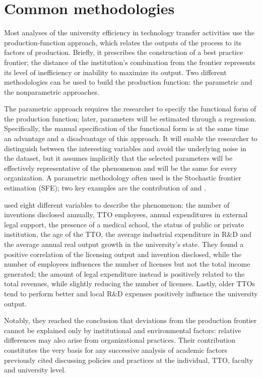\section{Common methodologies}

Most analyses of the university efficiency in technology transfer activities use the production-function approach, which relates the outputs of the process to its factors of production. Briefly, it prescribes the construction of a best practice frontier; the distance of the institution's combination from the frontier represents its level of inefficiency or inability to maximize its output. Two different methodologies can be used to build the production function: the parametric and the nonparametric approaches.

The parametric approach requires the researcher to specify the functional form of the production function; later, parameters will be estimated through a regression. Specifically, the manual specification of the functional form is at the same time an advantage and a disadvantage of this approach. It will enable the researcher to distinguish between the interesting variables and avoid the underlying noise in the dataset, but it assumes implicitly that the selected parameters will be effectively representative of the phenomenon and will be the same for every organization. A parametric methodology often used is the Stochastic frontier estimation (SFE); two key examples are the contribution of \citet{Siegel2003a} and \citet{Link2005}.

\citet{Siegel2003a} used eight different variables to describe the phenomenon: the number of inventions disclosed annually, TTO employees, annual expenditures in external legal support, the presence of a medical school, the status of public or private institution, the age of the TTO, the average industrial expenditure in R\&D and the average annual real output growth in the university's state. They found a positive correlation of the licensing output and invention disclosed, while the number of employees influences the number of licenses but not the total income generated; the amount of legal expenditure instead is positively related to the total revenues, while slightly reducing the number of licenses. Lastly, older TTOs tend to perform better and local R\&D expenses positively influence the university output. 

Notably, they reached the conclusion that deviations from the production frontier cannot be explained only by institutional and environmental factors: relative differences may also arise from organizational practices. Their contribution constitutes the very basis for any successive analysis of academic factors previously cited discussing policies and practices at the individual, TTO, faculty and university level. 

